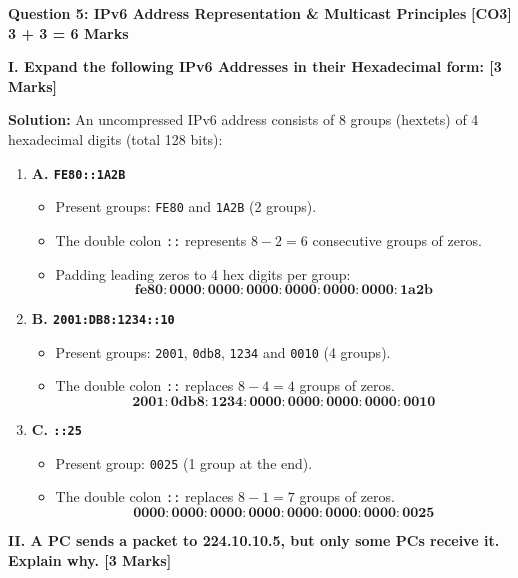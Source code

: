 \documentclass[11pt,a4paper]{article}
\newcommand{\questionheader}[3]{
    \vspace{0.35cm}
    \noindent\colorbox{qboxbg}{
        \parbox{\dimexpr\textwidth-2\fboxsep\relax}{
            \textbf{\textcolor{primary}{\large #1}} \hfill \textbf{\textcolor{accent}{[#2]}} \hfill \textbf{\textcolor{secondary}{#3 Marks}}
        }
    }
    \vspace{0.15cm}
}
\begin{document}
\questionheader{Question 5: IPv6 Address Representation \& Multicast Principles}{CO3}{3 + 3 = 6}

\textbf{I. Expand the following IPv6 Addresses in their Hexadecimal form: [3 Marks]}

\textbf{Solution:}
An uncompressed IPv6 address consists of 8 groups (hextets) of 4 hexadecimal digits (total 128 bits):
\begin{enumerate}
    \item \textbf{A. \texttt{FE80::1A2B}}
    \begin{itemize}
        \item Present groups: \texttt{FE80} and \texttt{1A2B} (2 groups).
        \item The double colon \texttt{::} represents $8 - 2 = 6$ consecutive groups of zeros.
        \item Padding leading zeros to 4 hex digits per group:
        \[
        \mathbf{fe80:0000:0000:0000:0000:0000:0000:1a2b}
        \]
    \end{itemize}

    \item \textbf{B. \texttt{2001:DB8:1234::10}}
    \begin{itemize}
        \item Present groups: \texttt{2001}, \texttt{0db8}, \texttt{1234} and \texttt{0010} (4 groups).
        \item The double colon \texttt{::} replaces $8 - 4 = 4$ groups of zeros.
        \[
        \mathbf{2001:0db8:1234:0000:0000:0000:0000:0010}
        \]
    \end{itemize}

    \item \textbf{C. \texttt{::25}}
    \begin{itemize}
        \item Present group: \texttt{0025} (1 group at the end).
        \item The double colon \texttt{::} replaces $8 - 1 = 7$ groups of zeros.
        \[
        \mathbf{0000:0000:0000:0000:0000:0000:0000:0025}
        \]
    \end{itemize}
\end{enumerate}

\vspace{0.2cm}
\textbf{II. A PC sends a packet to 224.10.10.5, but only some PCs receive it. Explain why. [3 Marks]}
\end{document}
